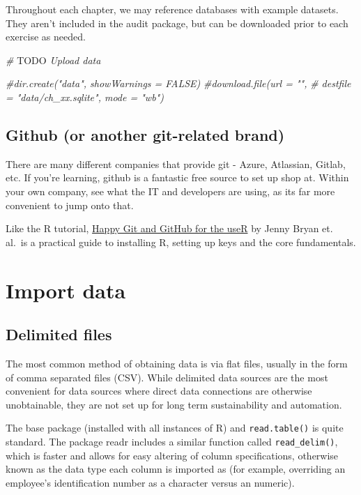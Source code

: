\documentclass[
]{book}
\newenvironment{Shaded}{\begin{snugshade}}{\end{snugshade}}
\newcommand{\AlertTok}[1]{\textcolor[rgb]{0.94,0.16,0.16}{#1}}
\newcommand{\CommentTok}[1]{\textcolor[rgb]{0.56,0.35,0.01}{\textit{#1}}}
\begin{document}
Throughout each chapter, we may reference databases with example datasets. They aren't included in the audit package, but can be downloaded prior to each exercise as needed.

\begin{Shaded}
\begin{Highlighting}[]
\CommentTok{# }\AlertTok{TODO}\CommentTok{ Upload data}

\CommentTok{#dir.create("data", showWarnings = FALSE)}
\CommentTok{#download.file(url = "",}
\CommentTok{#              destfile = "data/ch_xx.sqlite", mode = "wb")}
\end{Highlighting}
\end{Shaded}

\hypertarget{github-or-another-git-related-brand}{%
\section{Github (or another git-related brand)}\label{github-or-another-git-related-brand}}

There are many different companies that provide git - Azure, Atlassian, Gitlab, etc. If you're learning, github is a fantastic free source to set up shop at. Within your own company, see what the IT and developers are using, as its far more convenient to jump onto that.

Like the R tutorial, \href{https://happygitwithr.com}{Happy Git and GitHub for the useR} by Jenny Bryan et. al.~is a practical guide to installing R, setting up keys and the core fundamentals.

\hypertarget{import-data}{%
\chapter{Import data}\label{import-data}}

\hypertarget{delimited-files}{%
\section{Delimited files}\label{delimited-files}}

The most common method of obtaining data is via flat files, usually in the form of comma separated files (CSV). While delimited data sources are the most convenient for data sources where direct data connections are otherwise unobtainable, they are not set up for long term sustainability and automation.

The base package (installed with all instances of R) and \texttt{read.table()} is quite standard. The package readr includes a similar function called \texttt{read\_delim()}, which is faster and allows for easy altering of column specifications, otherwise known as the data type each column is imported as (for example, overriding an employee's identification number as a character versus an numeric).
\end{document}
